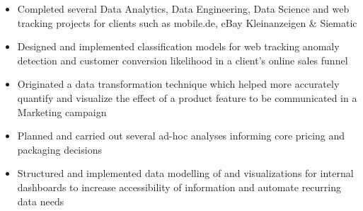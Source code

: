 \documentclass[9pt,a4paper,ragged2e]{altacv}
\begin{document}
    \begin{itemize}
        \item Completed several Data Analytics, Data Engineering, Data Science and web tracking projects for clients such as mobile.de, eBay Kleinanzeigen \& Siematic \\
        \item Designed and implemented classification models for web tracking anomaly detection and customer conversion likelihood in a client's online sales funnel
        \item Originated a data transformation technique which helped more accurately quantify and visualize the effect of a product feature to be communicated in a Marketing campaign
        \item Planned and carried out several ad-hoc analyses informing core pricing and packaging decisions
        \item Structured and implemented data modelling of and visualizations for internal dashboards to increase accessibility of information and automate recurring data needs

    \end{itemize}

    \divider
\end{document}

